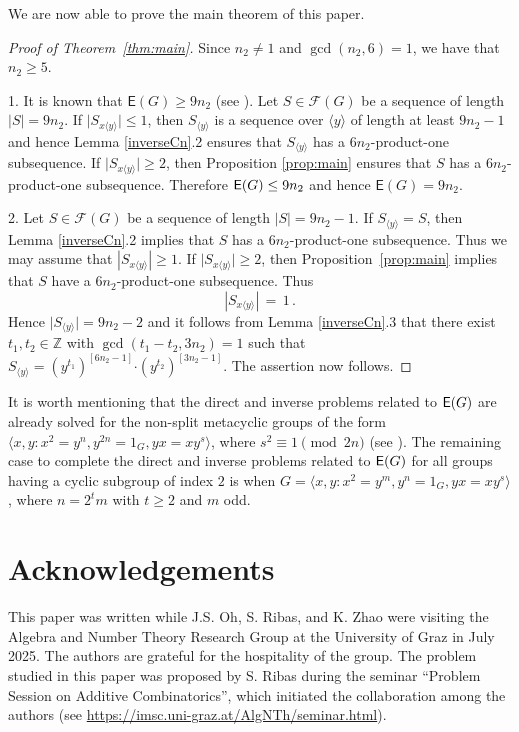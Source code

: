 \documentclass[leqno,a4paper]{amsart}
\def\E{{\sf E}}
\def\F{{\mathcal F}}
\def\bd{{\boldsymbol{\cdot}}}
\def\Z{\mathbb Z}
\theoremstyle{plain}
\theoremstyle{definition}
\numberwithin{equation}{section}
\begin{document}
	
	
	\smallskip
	We are now able to prove the main theorem of this paper.
	
	
	
	\medskip
	\begin{proof}[Proof of Theorem~\ref{thm:main}]
		Since $n_2\neq 1$ and $\gcd(n_2,6)=1$, we have  that $n_2\ge 5$.
		
		1. It is known that $\mathsf E(G)\ge 9n_2$ (see \cite[Lemma 4]{ZhGa}). Let $S \in \F(G)$ be a sequence of length $|S| = 9n_2$.
		If $\big| S_{x\langle y \rangle} \big| \le 1$, then $S_{\langle y\rangle }$ is a sequence over $\langle y\rangle$ of length at least $9n_2-1$ and hence Lemma \ref{inverseCn}.2 ensures that $S_{\langle y \rangle}$ has a $6n_2$-product-one subsequence.
		If $\big| S_{x\langle y \rangle} \big| \ge 2$, then Proposition \ref{prop:main} ensures that $S$ has a $6n_2$-product-one subsequence.
		Therefore $\E(G) \le  9n_2$ and hence $\mathsf E(G)= 9n_2$.
	
	
		2. Let $S \in \F(G)$ be a sequence of length $|S| = 9n_2-1$.
		If $S_{\langle y \rangle} = S$, then Lemma \ref{inverseCn}.2 implies that $S$ has a $6n_2$-product-one subsequence.
		Thus we may assume that $|S_{x\langle y \rangle}| \ge 1$.
		If $\big| S_{x\langle y \rangle} \big| \ge  2$, then Proposition~\ref{prop:main} implies that $S$  have a $6n_2$-product-one subsequence. Thus
        \[
          |S_{x\langle y \rangle}| \, = \, 1 \,.
        \]
		Hence $\big| S_{\langle y \rangle} \big| = 9n_2 - 2$ and it follows from  Lemma \ref{inverseCn}.3 that there exist $t_1, t_2 \in \Z$  with $\gcd(t_1 - t_2,3n_2)=1$ such that $S_{\langle y \rangle} = (y^{t_1})^{[6n_2-1]} \bd (y^{t_2})^{[3n_2-1]}$.
		The assertion now follows.
	\end{proof}
	



	\bigskip
		It is worth mentioning that the direct and inverse problems related to $\E(G)$ are already solved for the non-split metacyclic groups of the form $\langle x,y \colon x^2 = y^n, y^{2n} = 1_G, yx = xy^s \rangle$, where $s^2 \equiv 1 \pmod {2n}$ (see \cite{Rib,YZF}). The remaining case to complete the direct and inverse problems related to $\E(G)$ for all groups having a cyclic subgroup of index $2$ is when $G = \langle x, y \colon x^{2} = y^{m}, y^{n} = 1_G, yx = xy^{s} \rangle$, where $n = 2^{t}m$ with $t \ge 2$ and $m$ odd.
	
	
	
	\smallskip
	\section*{Acknowledgements}
	This paper was written while J.S. Oh, S. Ribas, and K. Zhao were visiting the Algebra and Number Theory Research Group at the University of Graz in July 2025. The authors are grateful for the hospitality of the group. The problem studied in this paper was proposed by S. Ribas during the seminar ``Problem Session on Additive Combinatorics'', which initiated the collaboration among the authors (see \url{https://imsc.uni-graz.at/AlgNTh/seminar.html}).
	
\end{document}
